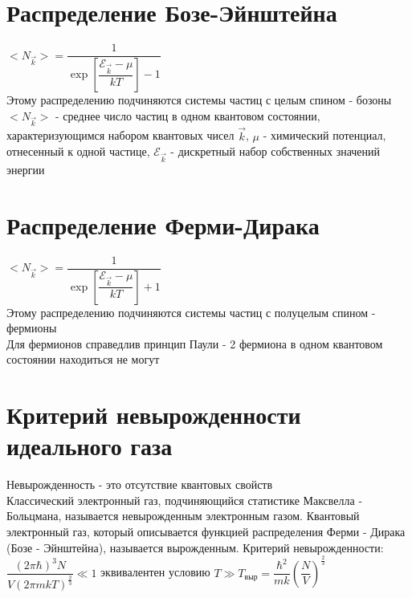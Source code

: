 \begin{multicols*}{2}
		\section{Распределение Бозе-Эйнштейна}
		$<N_{\vec{k}}> = \dfrac{1}{\exp\left[\dfrac{\mathcal{E}_{\vec{k}} - \mu}{kT}\right] - 1}$\\
		Этому распределению подчиняются системы частиц с целым спином - бозоны\\
		$<N_{\vec{k}}>$ - среднее число частиц в одном квантовом состоянии, характеризующимся набором квантовых чисел $\vec{k}$, $\mu$ - химический потенциал, отнесенный к одной частице, $\mathcal{E}_{\vec{k}}$ - дискретный набор собственных значений энергии\\

		\section{Распределение Ферми-Дирака}
		$<N_{\vec{k}}> = \dfrac{1}{\exp\left[\dfrac{\mathcal{E}_{\vec{k}} - \mu}{kT}\right] + 1}$\\
		Этому распределению подчиняются системы частиц с полуцелым спином - фермионы\\
		Для фермионов справедлив принцип Паули - 2 фермиона в одном квантовом состоянии находиться не могут\\

		\section{Критерий невырожденности идеального газа}
		Невырожденность - это отсутствие квантовых свойств\\
		Классический электронный газ, подчиняющийся статистике Максвелла - Больцмана, называется невырожденным электронным газом. Квантовый электронный газ, который описывается функцией распределения Ферми - Дирака (Бозе - Эйнштейна), называется вырожденным.
		Критерий невырожденности: $\dfrac{(2\pi \hbar)^3 N}{V(2\pi mkT)^{\frac{2}{3}}} \ll 1$ эквивалентен условию $T\gg T_{\text{выр}} = \dfrac{\hbar^2}{mk} \left(\dfrac{N}{V}\right)^{\frac{2}{3}}$\\


\end{multicols*}

